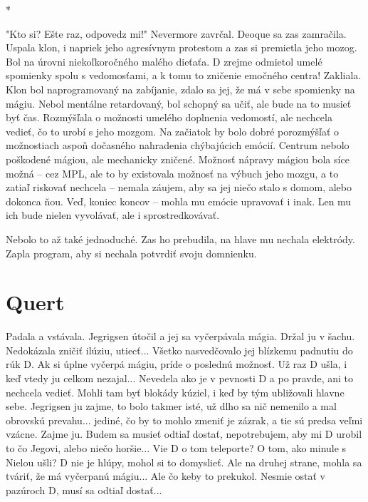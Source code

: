 \documentclass{book}
\begin{document}
\begin{center}

*

\end{center}

"$ $Kto si? Ešte raz, odpovedz mi!"$ $ Nevermore zavrčal. Deoque sa zas zamračila. Uspala klon, i napriek jeho agresívnym protestom a zas si premietla jeho mozog. Bol na úrovni niekoľkoročného malého dieťaťa. D zrejme odmietol umelé spomienky spolu s vedomosťami, a k tomu to zničenie emočného centra! Zakliala. Klon bol naprogramovaný na zabíjanie, zdalo sa jej, že má v sebe spomienky na mágiu. Nebol mentálne retardovaný, bol schopný sa učiť, ale bude na to musieť byť čas. Rozmýšľala o možnosti umelého doplnenia vedomostí, ale nechcela vedieť, čo to urobí s jeho mozgom. Na začiatok by bolo dobré porozmýšľať o možnostiach aspoň dočasného nahradenia chýbajúcich emócií. Centrum nebolo poškodené mágiou, ale mechanicky zničené. Možnosť nápravy mágiou bola síce možná – cez MPL, ale to by existovala možnosť na výbuch jeho mozgu, a to zatiaľ riskovať nechcela – nemala záujem, aby sa jej niečo stalo s domom, alebo dokonca ňou. Veď, koniec koncov – mohla mu emócie upravovať i inak. Len mu ich bude nielen vyvolávať, ale i sprostredkovávať.

Nebolo to až také jednoduché. Zas ho prebudila, na hlave mu nechala elektródy. Zapla program, aby si nechala potvrdiť svoju domnienku.

\chapter{Quert}

Padala a vstávala. Jegrigsen útočil a jej sa vyčerpávala mágia. Držal ju v šachu. Nedokázala zničiť ilúziu, utiecť... Všetko nasvedčovalo jej blízkemu padnutiu do rúk D. Ak si úplne vyčerpá mágiu, príde o poslednú možnosť. Už raz D ušla, i keď vtedy ju celkom nezajal... Nevedela ako je v pevnosti D a po pravde, ani to nechcela vedieť. Mohli tam byť blokády kúziel, i keď by tým ubližovali hlavne sebe. Jegrigsen ju zajme, to bolo takmer isté, už dlho sa nič nemenilo a mal obrovskú prevahu... jediné, čo by to mohlo zmeniť je zázrak, a tie sú predsa veľmi vzácne. Zajme ju. Budem sa musieť odtiaľ dostať, nepotrebujem, aby mi D urobil to čo Jegovi, alebo niečo horšie... Vie D o tom teleporte? O tom, ako minule s Nielou ušli? D nie je hlúpy, mohol si to domyslieť. Ale na druhej strane, mohla sa tváriť, že má vyčerpanú mágiu... Ale čo keby to prekukol. Nesmie ostať v pazúroch D, musí sa odtiaľ dostať...
\end{document}
